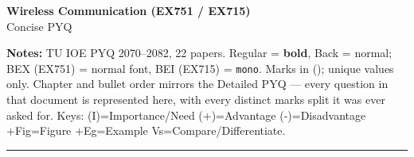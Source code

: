 \documentclass[10pt]{article}
\begin{document}
\begin{center}
  {\large\bfseries Wireless Communication (EX751 / EX715)}\\[0.15em]
  {\normalsize Concise PYQ}
\end{center}
\vspace{-0.4em}
\small
\textbf{Notes:} TU IOE PYQ 2070--2082, 22 papers. Regular = \textbf{bold}, Back = normal; BEX (EX751) = normal font, BEI (EX715) = \texttt{mono}.
Marks in (); unique values only. Chapter and bullet order mirrors the Detailed PYQ --- every question in that document is represented here, with every distinct marks split it was ever asked for.
Keys: (I)=Importance/Need \quad (+)=Advantage \quad (-)=Disadvantage \quad +Fig=Figure \quad +Eg=Example \quad Vs=Compare/Differentiate.
\vspace{2pt}
\hrule
\vspace{4pt}
\end{document}
